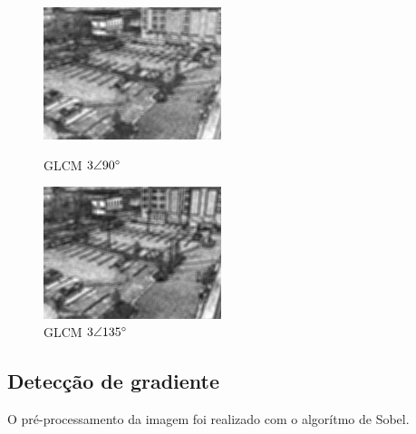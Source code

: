 \documentclass[10pt,twocolumn,letterpaper]{article}
\begin{document}
\begin{figure}[!htb]
  \includegraphics[width=\linewidth]{GLCM90-Homogeneidade.jpg}
  \caption{GLCM $3\angle 90\degree$}\label{fig:glcm90}
\endminipage\hfill
{}
  \includegraphics[width=\linewidth]{GLCM135-Homogeneidade.jpg}
  \caption{GLCM $3\angle 135\degree$}\label{fig:glcm135}
\endminipage
\end{figure}


\subsection{Detecção de gradiente}
	
	O pré-processamento da imagem foi realizado com o algorítmo de Sobel.
\end{document}
